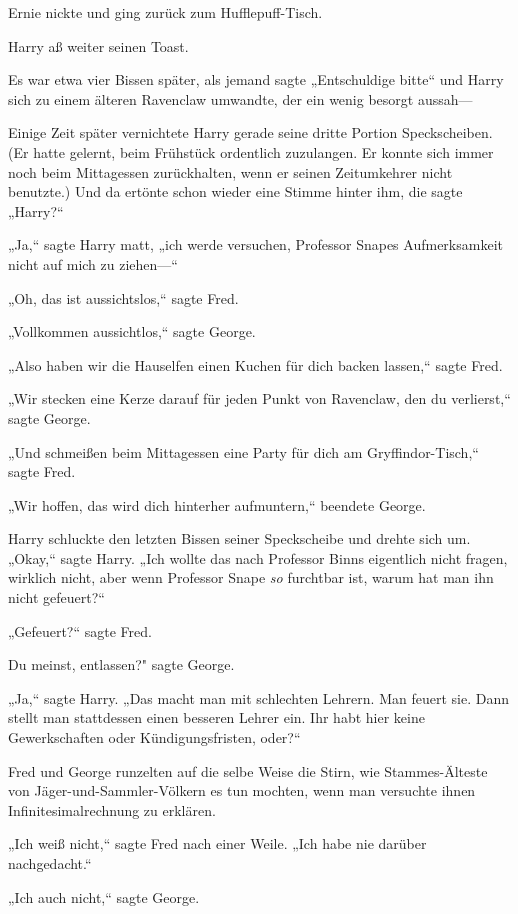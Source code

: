 {Ernie nickte und ging zurück zum Hufflepuff-Tisch.

Harry aß weiter seinen Toast.

Es war etwa vier Bissen später, als jemand sagte „Entschuldige bitte“ und Harry sich zu einem älteren Ravenclaw umwandte, der ein wenig besorgt aussah—

Einige Zeit später vernichtete Harry gerade seine dritte Portion Speckscheiben. (Er hatte gelernt, beim Frühstück ordentlich zuzulangen. Er konnte sich immer noch beim Mittagessen zurückhalten, wenn er seinen Zeitumkehrer nicht benutzte.) Und da ertönte schon wieder eine Stimme hinter ihm, die sagte „Harry?“

„Ja,“ sagte Harry matt, „ich werde versuchen, Professor Snapes Aufmerksamkeit nicht auf mich zu ziehen—“

„Oh, das ist aussichtslos,“ sagte Fred.

„Vollkommen aussichtlos,“ sagte George.

„Also haben wir die Hauselfen einen Kuchen für dich backen lassen,“ sagte Fred.

„Wir stecken eine Kerze darauf für jeden Punkt von Ravenclaw, den du verlierst,“ sagte George.

„Und schmeißen beim Mittagessen eine Party für dich am Gryffindor-Tisch,“ sagte Fred.

„Wir hoffen, das wird dich hinterher aufmuntern,“ beendete George.

Harry schluckte den letzten Bissen seiner Speckscheibe und drehte sich um. „Okay,“ sagte Harry. „Ich wollte das nach Professor Binns eigentlich nicht fragen, wirklich nicht, aber wenn Professor Snape \emph{so} furchtbar ist, warum hat man ihn nicht gefeuert?“

„Gefeuert?“ sagte Fred.

Du meinst, entlassen?" sagte George.

„Ja,“ sagte Harry. „Das macht man mit schlechten Lehrern. Man feuert sie. Dann stellt man stattdessen einen besseren Lehrer ein. Ihr habt hier keine Gewerkschaften oder Kündigungsfristen, oder?“

Fred und George runzelten auf die selbe Weise die Stirn, wie Stammes-Älteste von Jäger-und-Sammler-Völkern es tun mochten, wenn man versuchte ihnen Infinitesimalrechnung zu erklären.

„Ich weiß nicht,“ sagte Fred nach einer Weile. „Ich habe nie darüber nachgedacht.“

„Ich auch nicht,“ sagte George.

}

